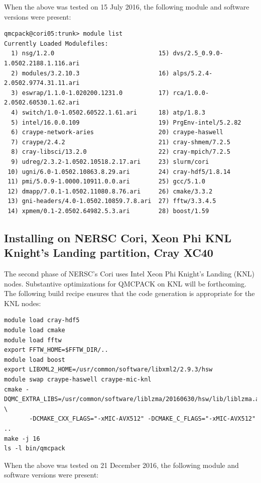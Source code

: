 When the above was tested on 15 July 2016, the following module and
software versions were present:

\begin{verbatim}
qmcpack@cori05:trunk> module list
Currently Loaded Modulefiles:
  1) nsg/1.2.0                             15) dvs/2.5_0.9.0-1.0502.2188.1.116.ari
  2) modules/3.2.10.3                      16) alps/5.2.4-2.0502.9774.31.11.ari
  3) eswrap/1.1.0-1.020200.1231.0          17) rca/1.0.0-2.0502.60530.1.62.ari
  4) switch/1.0-1.0502.60522.1.61.ari      18) atp/1.8.3
  5) intel/16.0.0.109                      19) PrgEnv-intel/5.2.82
  6) craype-network-aries                  20) craype-haswell
  7) craype/2.4.2                          21) cray-shmem/7.2.5
  8) cray-libsci/13.2.0                    22) cray-mpich/7.2.5
  9) udreg/2.3.2-1.0502.10518.2.17.ari     23) slurm/cori
 10) ugni/6.0-1.0502.10863.8.29.ari        24) cray-hdf5/1.8.14
 11) pmi/5.0.9-1.0000.10911.0.0.ari        25) gcc/5.1.0
 12) dmapp/7.0.1-1.0502.11080.8.76.ari     26) cmake/3.3.2
 13) gni-headers/4.0-1.0502.10859.7.8.ari  27) fftw/3.3.4.5
 14) xpmem/0.1-2.0502.64982.5.3.ari        28) boost/1.59
\end{verbatim}

\subsection{Installing on NERSC Cori, Xeon Phi KNL Knight's Landing partition, Cray XC40}
The second phase of NERSC's Cori uses Intel
Xeon Phi Knight's Landing (KNL) nodes. Substantive optimizations for QMCPACK on KNL will
be forthcoming. The following build recipe ensures that the code
generation is appropriate for the KNL nodes:

\begin{verbatim}
module load cray-hdf5
module load cmake
module load fftw
export FFTW_HOME=$FFTW_DIR/..
module load boost
export LIBXML2_HOME=/usr/common/software/libxml2/2.9.3/hsw
module swap craype-haswell craype-mic-knl
cmake -DQMC_EXTRA_LIBS=/usr/common/software/liblzma/20160630/hsw/lib/liblzma.a \
       -DCMAKE_CXX_FLAGS="-xMIC-AVX512" -DCMAKE_C_FLAGS="-xMIC-AVX512" ..
make -j 16
ls -l bin/qmcpack
\end{verbatim}

When the above was tested on 21 December 2016, the following module and
software versions were present:


